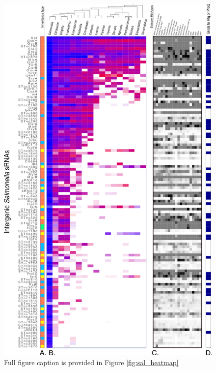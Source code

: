 \begin{figure}[H]
    \centering
    \includegraphics{sal/heatmap_split_2.png}
    \caption{Full figure caption is provided in Figure \ref{fig:sal_heatmap}}
    \label{fig:sal_heatmap2}
\end{figure}
\newpage
\newpage
